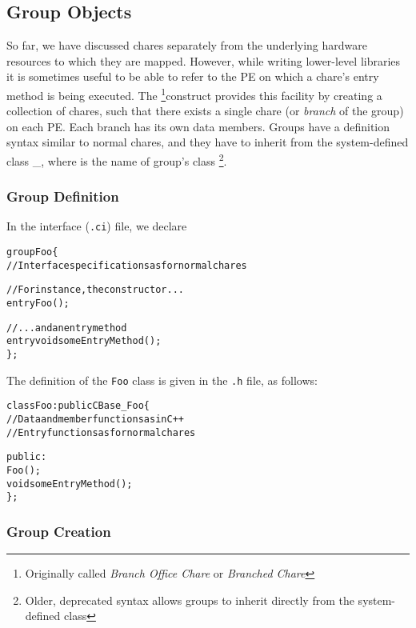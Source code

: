 \subsection{Group Objects}

\label{sec:group}

So far, we have discussed chares separately from the underlying hardware resources 
to which they are mapped. However, while writing lower-level libraries it is sometimes
useful to be able to refer to the PE on which a chare's entry method is being executed.
The  \footnote{Originally called {\em Branch Office Chare} or 
{\em Branched Chare}}construct provides this facility by creating a 
collection of chares, such that 
there exists a single chare (or {\sl branch} of the group) on each
PE.   Each branch has its own data members.  Groups have
a definition syntax similar to normal chares,
and they have to inherit from the system-defined class \_, 
where  is the name of group's \CC{} class
\footnote{Older, deprecated syntax allows groups to inherit directly from the
system-defined class }.

\subsubsection{Group Definition}

In the interface ({\tt .ci}) file, we declare

\begin{alltt}
group Foo \{
  // Interface specifications as for normal chares

  // For instance, the constructor ...
  entry Foo();

  // ... and an entry method
  entry void someEntryMethod();
\};
\end{alltt}

The definition of the {\tt Foo} class is given in the \texttt{.h} file, as follows:

\begin{alltt}
class Foo : public CBase\_Foo \{
  // Data and member functions as in C++
  // Entry functions as for normal chares

  public:
    Foo();
    void someEntryMethod();
\};
\end{alltt}

\subsubsection{Group Creation}

